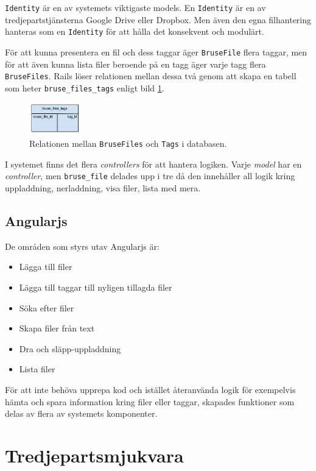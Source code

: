 \texttt{Identity} är en av systemets viktigaste models. En \texttt{Identity} är en av
tredjepartstjänsterna Google Drive eller Dropbox. Men även den egna filhantering
hanteras som en \texttt{Identity} för att hålla det konsekvent och modulärt.

För att kunna presentera en fil och dess taggar äger \texttt{BruseFile} flera
taggar, men för att även kunna lista filer beroende på en tagg äger varje tagg
flera \texttt{BruseFiles}. Rails löser relationen mellan dessa två genom att skapa
en tabell som heter \texttt{bruse\_files\_tags} enligt bild
\ref{fig:bruse_files_tags}.

\begin{figure}[!h]
\centering
\includegraphics[width=0.2\textwidth]{figures/bruse_files_tags.png}
\caption{Relationen mellan \texttt{BruseFiles} och \texttt{Tags} i databasen.}
\label{fig:bruse_files_tags}
\end{figure}

I systemet finns det flera \emph{controllers} för att hantera logiken. Varje
\emph{model} har en \emph{controller}, men \texttt{bruse\_file} delades upp i tre
då den innehåller all logik kring uppladdning, nerladdning, visa filer, lista
med mera.

\subsection{Angularjs}
De områden som styrs utav Angularjs är:
\begin{itemize}
  \item Lägga till filer
  \item Lägga till taggar till nyligen tillagda filer
  \item Söka efter filer
  \item Skapa filer från text
  \item Dra och släpp-uppladdning
  \item Lista filer
\end{itemize}

För att inte behöva upprepa kod och istället återanvända logik för exempelvis
hämta och spara information kring filer eller taggar, skapades funktioner som
delas av flera av systemets komponenter.

\section{Tredjepartsmjukvara}

